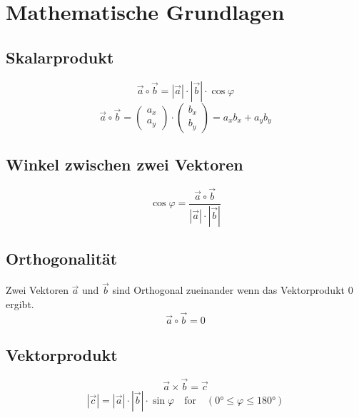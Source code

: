 \chapter{Mathematische Grundlagen}
\label{chp:MathematischeGrundlagen}




\section{Skalarprodukt}
\label{chp:MathematischeGrundlagen:sec:skalarprodukt}

	\begin{equation}
		\vec{a} \circ \vec{b} = |\vec{a}| \cdot |\vec{b}| \cdot \cos\varphi 
	\end{equation}
	\begin{equation}
		\vec{a} \circ \vec{b} =
		\left(
		\begin{array}{c}
		a_{x} \\
		a_{y}
		\end{array}
		\right) 
		\cdot 
		\left(
		\begin{array}{c}
		b_{x} \\
		b_{y}
		\end{array}
		\right)
		=
		a_{x}b_{x}
		+
		a_{y}b_{y} 
	\end{equation}

\section{Winkel zwischen zwei Vektoren}
\label{chp:MathematischeGrundlagen:sec:winkelVektoren}
	\begin{equation}
		\cos\varphi = \frac{\vec{a} \circ \vec{b}}{|\vec{a}| \cdot |\vec{b}|}
	\end{equation}	


\section{Orthogonalität}
\label{chp:MathematischeGrundlagen:sec:Orthogonalität}
	Zwei Vektoren $\vec{a}$ und $\vec{b}$ sind Orthogonal zueinander wenn das Vektorprodukt 0 ergibt.
		\begin{equation}
			\vec{a} \circ \vec{b} = 0
		\end{equation}

\section{Vektorprodukt}
\label{chp:MathematischeGrundlagen:sec:Vektorprodukt}
	\begin{equation}
		\vec{a} \times \vec{b} = \vec{c}
	\end{equation}
	\begin{equation}
		|\vec{c}| = |\vec{a}| \cdot |\vec{b}| \cdot \sin\varphi 
		\quad \textrm{for} \quad 
		(\ang{0} \leq \varphi \leq \ang{180})
	\end{equation}

